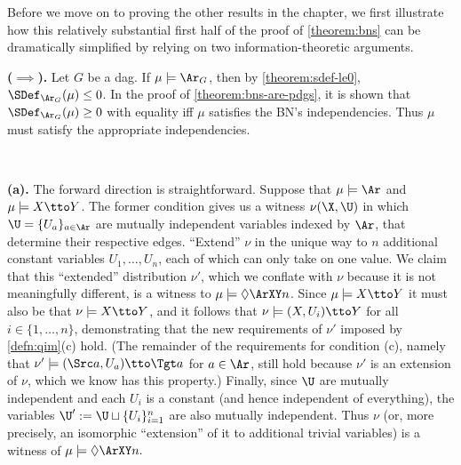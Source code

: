 \begin{subappendices}
Before we move on to proving the other results in the chapter, we first illustrate how this relatively substantial first half of the proof of \cref{theorem:bns} can be dramatically simplified by relying on two information-theoretic arguments.

\begin{lproof}
    \textbf{($\implies$).}
    Let $G$ be a dag.     
    If $\mu \models \Ar_{G}$, then by \cref{theorem:sdef-le0}, 
    $\SDef_{\Ar_{G}}(\mu) \le 0$.
    In the proof of \cref{theorem:bns-are-pdgs},
    it is shown that $\SDef_{\Ar_G}(\mu) \ge 0$ with equality iff $\mu$ satisfies the BN's independencies. 
    Thus $\mu$ must satisfy the appropriate independencies.
\end{lproof}


~%
\begin{lproof}\label{proof:func}
\textbf{(a).} 
The forward direction is straightforward. 
Suppose that $\mu \models \Ar$ and $\mu \models X \tto Y$.
The former condition gives us a witness
$\nu(\X,\U)$ in which $\U = \{ U_a \}_{a \in \Ar}$ are mutually independent variables indexed by $\Ar$, that determine their respective edges. 
``Extend'' $\nu$ in the unique way to $n$ additional constant variables $U_1, \ldots, U_n$, each of which can only take on one value. 
We claim that this ``extended'' distribution $\nu'$, which we conflate with $\nu$ because it is not meaningfully different, is a witness to $\mu \models  \Diamond \ArXY n$.
Since $\mu \models X \tto Y$ it must also be that $\nu \models X \tto Y$, and it follows that $\nu \models (X,U_i)\tto Y$ for all $i \in \{1,\ldots,n\}$, demonstrating that
the new requirements of $\nu'$ imposed by \cref{defn:qim}(c) hold. 
(The remainder of the requirements for condition (c), namely that $\nu' \models (\Src a, U_a) \tto \Tgt a$ for $a \in \Ar$, still hold because $\nu'$ is an extension of $\nu$, which we know has this property.)
Finally, since $\U$ are mutually independent and each $U_i$ is a constant (and hence independent of everything), the variables $\U' := \U \sqcup \{ U_i \}_{i=1}^n$ are also mutually independent. 
Thus $\nu$ (or, more precisely, an isomorphic ``extension'' of it to additional trivial variables) is a witness of
 $\mu \models  \Diamond \ArXY n.$
 

\end{lproof}
\end{subappendices}
